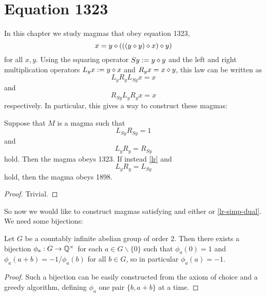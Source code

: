 \chapter{Equation 1323}\label{1323-chapter}

In this chapter we study magmas that obey equation 1323,
\begin{equation}\label{1323}
  x = y \diamond (((y \diamond y) \diamond x) \diamond y)
\end{equation}
for all $x,y$.  Using the squaring operator $Sy := y \diamond y$ and the left and right multiplication operators $L_y x := y \diamond x$ and $R_y x = x \diamond y$, this law can be written as
$$ L_y R_y L_{Sy} x = x$$
and
$$ R_{Sy} L_y R_y x = x$$
respectively.  In particular, this gives a way to construct these magmas:

\begin{lemma}\label{1323-1898-construct}  Suppose that $M$ is a magma such that
  \begin{equation}\label{lr}
    L_{Sy} R_{Sy} = 1
   \end{equation}
and
\begin{equation}\label{lr-simp}
  L_{y} R_{y} = R_{Sy}
\end{equation}
hold.  Then the magma obeys 1323.  If instead \eqref{lr} and
\begin{equation}\label{lr-simp-dual}
  L_{y} R_{y} = L_{Sy}
\end{equation}
hold, then the magma obeys 1898.
\end{lemma}

\begin{proof} Trivial.
\end{proof}

 So now we would like to construct magmas satisfying  and either  or \eqref{lr-simp-dual}.  We need some bijections:

 \begin{lemma}[Bijections]\label{bij}
  Let $G$ be a countably infinite abelian group of order $2$.  Then there exists a bijection $\phi_a: G \to \mathbb{Q}^\times$ for each $a \in G \backslash \{0\}$ such that
 $\phi_a(0) = 1$ and $\phi_a(a+b) = -1/\phi_a(b)$ for all $b \in G$, so in particular $\phi_a(a)=-1$.
 \end{lemma}

 \begin{proof}
  Such a bijection can be easily constructed from the axiom of choice and a greedy algorithm, defining $\phi_a$ one pair $\{b,a+b\}$ at a time.
 \end{proof}


